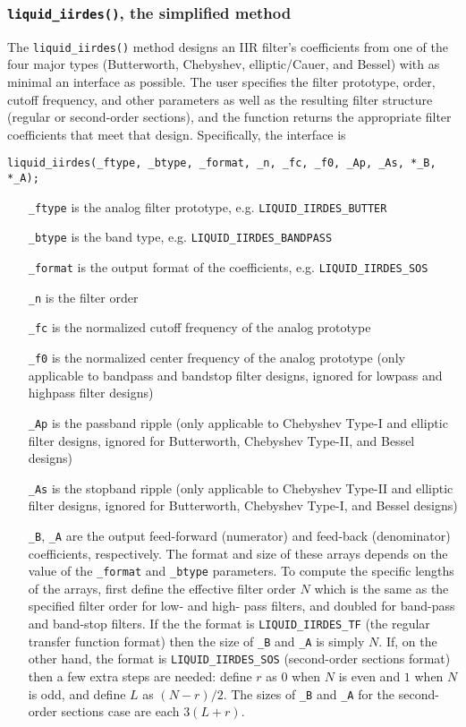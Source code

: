 \subsubsection{{\tt liquid\_iirdes()}, the simplified method}
\label{module:filter:iirdes:iirdes}
The {\tt liquid\_iirdes()} method designs an IIR filter's coefficients
from one of the four major types
(Butterworth, Chebyshev, elliptic/Cauer, and Bessel)
with as minimal an interface as possible.
The user specifies the filter prototype, order, cutoff frequency, and
other parameters as well as the resulting filter structure
(regular or second-order sections),
and the function returns the appropriate filter coefficients that meet
that design.
Specifically, the interface is
%
\begin{Verbatim}[fontsize=\small]
    liquid_iirdes(_ftype, _btype, _format, _n, _fc, _f0, _Ap, _As, *_B, *_A);
\end{Verbatim}
%
\begin{itemize}
\item[{\tt \_ftype}]
    is the analog filter prototype, e.g. {\tt LIQUID\_IIRDES\_BUTTER}
\item[{\tt \_btype}]
    is the band type, e.g. {\tt LIQUID\_IIRDES\_BANDPASS}
\item[{\tt \_format}]
    is the output format of the coefficients, e.g. {\tt LIQUID\_IIRDES\_SOS}
\item[{\tt \_n}]
    is the filter order
\item[{\tt \_fc}]
    is the normalized cutoff frequency of the analog prototype
\item[{\tt \_f0}]
    is the normalized center frequency of the analog prototype (only
    applicable to bandpass and bandstop filter designs, ignored for lowpass
    and highpass filter designs)
\item[{\tt \_Ap}]
    is the passband ripple (only applicable to Chebyshev Type-I and elliptic
    filter designs, ignored for Butterworth, Chebyshev Type-II, and Bessel
    designs)
\item[{\tt \_As}]
    is the stopband ripple (only applicable to Chebyshev Type-II and elliptic
    filter designs, ignored for Butterworth, Chebyshev Type-I, and Bessel
    designs)
\item[{\tt \_B}, {\tt \_A}]
    are the output feed-forward (numerator) and feed-back (denominator)
    coefficients, respectively.
    The format and size of these arrays depends on the value of the
    {\tt \_format} and {\tt \_btype} parameters.
    To compute the specific lengths of the arrays, first define the
    effective filter order $N$ which is the same as the specified filter
    order for low- and high- pass filters, and doubled for band-pass and
    band-stop filters.
    If the the format is {\tt LIQUID\_IIRDES\_TF}
    (the regular transfer function format)
    then the size of {\tt \_B} and {\tt \_A} is simply $N$.
    If, on the other hand, the format is {\tt LIQUID\_IIRDES\_SOS}
    (second-order sections format) then a few extra steps are needed:
    define $r$ as $0$ when $N$ is even and $1$ when $N$ is odd, and
    define $L$ as $(N-r)/2$.
    The sizes of {\tt \_B} and {\tt \_A} for the second-order sections
    case are each $3(L+r)$.
\end{itemize}
